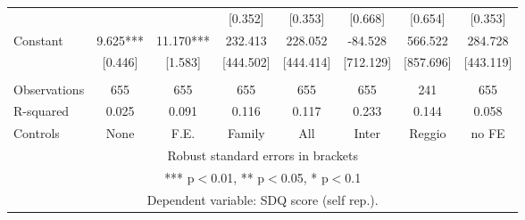 \begin{tabular}{lccccccc}
 &  &  & [0.352] & [0.353] & [0.668] & [0.654] & [0.353] \\
Constant & 9.625*** & 11.170*** & 232.413 & 228.052 & -84.528 & 566.522 & 284.728 \\
 & [0.446] & [1.583] & [444.502] & [444.414] & [712.129] & [857.696] & [443.119] \\
 &  &  &  &  &  &  &  \\
Observations & 655 & 655 & 655 & 655 & 655 & 241 & 655 \\
R-squared & 0.025 & 0.091 & 0.116 & 0.117 & 0.233 & 0.144 & 0.058 \\
 Controls & None & F.E. & Family & All & Inter & Reggio & no FE \\ \hline
\multicolumn{8}{c}{ Robust standard errors in brackets} \\
\multicolumn{8}{c}{ *** p$<$0.01, ** p$<$0.05, * p$<$0.1} \\
\multicolumn{8}{c}{ Dependent variable: SDQ score (self rep.).} \\
\end{tabular}
